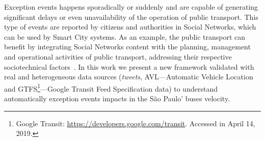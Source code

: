 \documentclass[runningheads]{llncs}
\begin{document}
Exception events happens sporadically or suddenly and are capable of generating significant delays or even unavailability of the operation of public transport. This type of events are reported by citizens and authorities in Social Networks, which can be used by Smart City systems. As an example, the public transport can benefit by integrating Social Networks content with the planning, management and operational activities of public transport, addressing their respective sociotechnical factors~\cite{kuflik2017automating}. In this work we present a new framework validated with real and heterogeneous data sources (\textit{tweets}, AVL---Automatic Vehicle Location and GTFS\footnote{\label{googleTransit}Google Transit: \url{https://developers.google.com/transit}. Accessed in April 14, 2019.}---Google Transit Feed Specification data) to understand automatically exception events impacts in the São Paulo' buses velocity.

\end{document}
